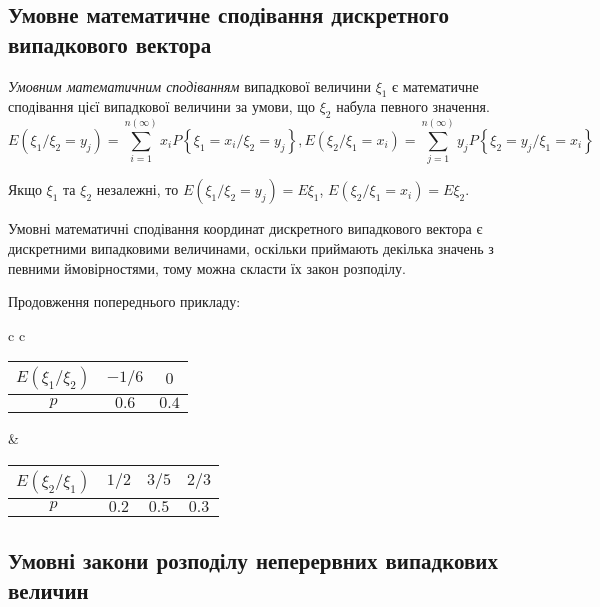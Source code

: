 \subsection{Умовне математичне сподівання дискретного випадкового вектора}
\begin{definition}
    \emph{Умовним математичним сподіванням} випадкової величини $\xi_1$ 
    є математичне сподівання цієї випадкової величини за умови, що 
    $\xi_2$ набула певного значення.
    $$E(\xi_1 / \xi_2 = y_j) =
\sum\limits_{i=1}^{n(\infty)}x_i 
P\left\{\xi_1 = x_i / \xi_2 = y_j\right\}, 
E(\xi_2 / \xi_1 = x_i) = \sum\limits_{j=1}^{n(\infty)}y_j 
P\left\{\xi_2 = y_j / \xi_1 = x_i\right\}$$
\end{definition}

\begin{remark}
    Якщо $\xi_1$ та $\xi_2$ незалежні, то $E(\xi_1 / \xi_2 = y_j) 
    = E\xi_1$, $E(\xi_2 / \xi_1 = x_i) = E\xi_2$.
\end{remark}

Умовні математичні сподівання координат дискретного випадкового вектора є дискретними випадковими величинами, оскільки 
приймають декілька значень з певними ймовірностями, тому можна скласти 
їх закон розподілу.
\begin{example}
    Продовження попереднього прикладу:

    \begin{tabular}{c c}
        \begin{tabular}{|c|c|c|}
            \hline
            $E(\xi_1 / \xi_2)$ & $-1/6$ & $0$ \\
            \hline
            $p$ & $0.6$ & $0.4$ \\
            \hline
        \end{tabular}
        &
        \begin{tabular}{|c|c|c|c|}
            \hline
            $E(\xi_2 / \xi_1)$ & $1/2$ & $3/5$ & $2/3$ \\
            \hline
            $p$ & $0.2$ & $0.5$ & $0.3$ \\
            \hline
        \end{tabular}
    \end{tabular}
\end{example}

\subsection{Умовні закони розподілу неперервних випадкових величин}

